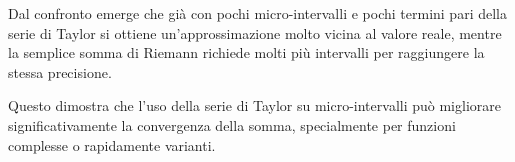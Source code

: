 \documentclass[10pt]{extarticle}
\begin{document}
Dal confronto emerge che già con pochi micro-intervalli e pochi termini pari della serie di Taylor si ottiene un'approssimazione molto vicina al valore reale, mentre la semplice somma di Riemann richiede molti più intervalli per raggiungere la stessa precisione.  

Questo dimostra che l'uso della serie di Taylor su micro-intervalli può migliorare significativamente la convergenza della somma, specialmente per funzioni complesse o rapidamente varianti.
\end{document}
